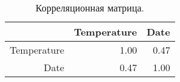 \begin{table}[ht]
\centering
\begin{tabular}{rrr}
  \hline
 & Temperature & Date \\ 
  \hline
Temperature & 1.00 & 0.47 \\ 
  Date & 0.47 & 1.00 \\ 
   \hline
\end{tabular}
\caption{Корреляционная матрица.} 
\label{table:cmatrix}
\end{table}
